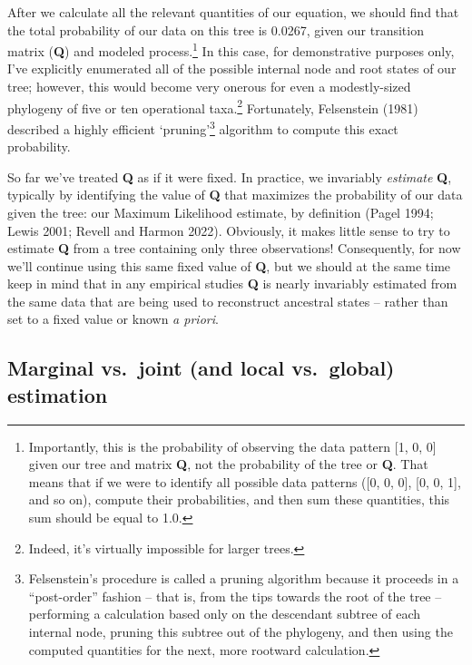 \documentclass{article}
\begin{document}
After we calculate all the relevant quantities of our equation, we should find that the total probability of our data on this tree is 0.0267, given our transition matrix (\textbf{Q}) and modeled process.\footnote{Importantly, this is the probability of observing the data pattern [1, 0, 0] given our tree and matrix \textbf{Q}, not the probability of the tree or \textbf{Q}. That means that if we were to identify all possible data patterns ([0, 0, 0], [0, 0, 1], and so on), compute their probabilities, and then sum these quantities, this sum should be equal to 1.0.} In this case, for demonstrative purposes only, I've explicitly enumerated all of the possible internal node and root states of our tree; however, this would become very onerous for even a modestly-sized phylogeny of five or ten operational taxa.\footnote{Indeed, it's virtually impossible for larger trees.} Fortunately, Felsenstein (1981) described a highly efficient `pruning'\footnote{Felsenstein's procedure is called a pruning algorithm because it proceeds in a ``post-order'' fashion -- that is, from the tips towards the root of the tree -- performing a calculation based only on the descendant subtree of each internal node, pruning this subtree out of the phylogeny, and then using the computed quantities for the next, more rootward calculation.} algorithm to compute this exact probability.

So far we've treated \textbf{Q} as if it were fixed. In practice, we invariably \emph{estimate} \textbf{Q}, typically by identifying the value of \textbf{Q} that maximizes the probability of our data given the tree: our Maximum Likelihood estimate, by definition (Pagel 1994; Lewis 2001; Revell and Harmon 2022). Obviously, it makes little sense to try to estimate \textbf{Q} from a tree containing only three observations! Consequently, for now we'll continue using this same fixed value of \textbf{Q}, but we should at the same time keep in mind that in any empirical studies \textbf{Q} is nearly invariably estimated from the same data that are being used to reconstruct ancestral states -- rather than set to a fixed value or known \emph{a priori}.

\subsection{Marginal vs.~joint (and local vs.~global) estimation}\label{marginal-vs.-joint-and-local-vs.-global-estimation}
\end{document}
